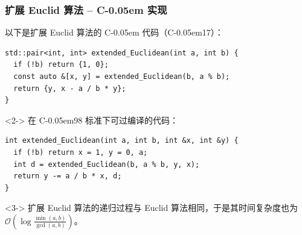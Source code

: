 \documentclass{../pkslide}
\newcommand{\Cpp}{\texorpdfstring{C\kern-0.05em\protect\raisebox{.35ex}{\textsmaller[2]{+\kern-0.05em+}}}{C++}}
\begin{document}
\begin{frame}[fragile]
  \frametitle{扩展 Euclid 算法 -- \Cpp{} 实现}
  以下是扩展 Euclid 算法的 \Cpp{} 代码（\Cpp{}17）：
  
\begin{verbatim}
std::pair<int, int> extended_Euclidean(int a, int b) {
  if (!b) return {1, 0};
  const auto &[x, y] = extended_Euclidean(b, a % b);
  return {y, x - a / b * y};
}
\end{verbatim}
  
  \begin{uncoverenv}<2->
    在 \Cpp{}98 标准下可过编译的代码：
    
\begin{verbatim}
int extended_Euclidean(int a, int b, int &x, int &y) {
  if (!b) return x = 1, y = 0, a;
  int d = extended_Euclidean(b, a % b, y, x);
  return y -= a / b * x, d;
}
\end{verbatim}
  \end{uncoverenv}
  
  \begin{uncoverenv}<3->
    扩展 Euclid 算法的递归过程与 Euclid 算法相同，于是其时间复杂度也为 $\mathcal O \!\left( \log \frac{\min(a, b)}{\gcd(a, b)} \right)$。
  \end{uncoverenv}
\end{frame}
\end{document}
